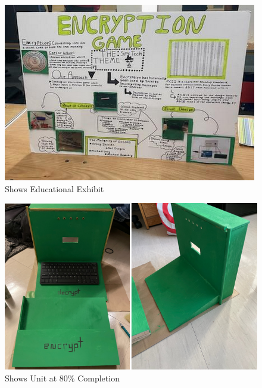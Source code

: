 \documentclass[conference]{IEEEtran}
\begin{document}
 \begin{figure}[H]
   \centering
   \includegraphics[width=.75\textwidth]{Figures/Log/PhotoLog5.png}
   \caption{Shows Educational Exhibit}
 \end{figure}
 \begin{figure}[H]
   \centering
   \includegraphics[width=.9\textwidth]{Figures/Log/PhotoLog6.png}
   \caption{Shows Unit at 80\% Completion}
 \end{figure}
\end{document}
